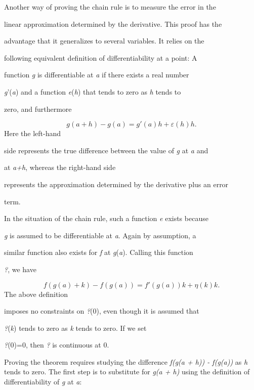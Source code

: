{Another way of proving the chain rule is to measure the error in the

linear approximation determined by the derivative. This proof has the

advantage that it generalizes to several variables. It relies on the

following equivalent definition of differentiability at a point: A

function \textit{g} is differentiable at \textit{a} if there exists a real number

\textit{g}'(\textit{a}) and a function \textit{e}(\textit{h}) that tends to zero as \textit{h} tends to

zero, and furthermore



$$g(a + h) - g(a) = g'(a) h + \varepsilon(h) h.$$ Here the left-hand

side represents the true difference between the value of \textit{g} at \textit{a} and

at \textit{a+h}, whereas the right-hand side

represents the approximation determined by the derivative plus an error

term.



In the situation of the chain rule, such a function \textit{e} exists because

\textit{g} is assumed to be differentiable at \textit{a}. Again by assumption, a

similar function also exists for \textit{f} at \textit{g}(\textit{a}). Calling this function

\textit{?}, we have



$$f(g(a) + k) - f(g(a)) = f'(g(a)) k + \eta(k) k.$$ The above definition

imposes no constraints on \textit{?}(0), even though it is assumed that

\textit{?}(\textit{k}) tends to zero as \textit{k} tends to zero. If we set

\textit{?}(0)=0, then \textit{?} is continuous at 0.



Proving the theorem requires studying the difference \textit{f(g(a + h)) - f(g(a))} as \textit{h} tends to zero. The first step is to substitute for \textit{g(a + h)} using the definition of differentiability of \textit{g} at \textit{a}:



}
